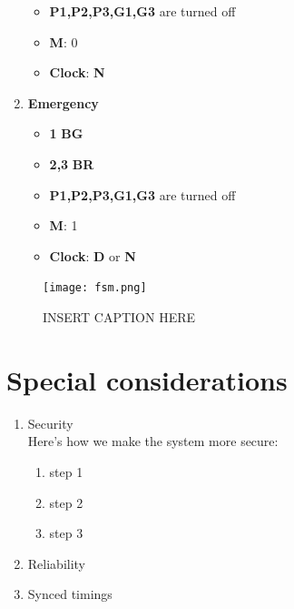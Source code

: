 \documentclass[letterpaper]{article}
\begin{document}
\begin{enumerate}
\begin{itemize}
        \item \textbf{P1,P2,P3,G1,G3} are turned off
        \item \textbf{M}: 0
        \item \textbf{Clock}: \textbf{N}
       \end{itemize}
 \item \textbf{Emergency}
       \begin{itemize}
        \item {\color{green}\textbf{1}} \textbf{BG}
        \item {\color{red}\textbf{2,3}} \textbf{BR}
        \item \textbf{P1,P2,P3,G1,G3} are turned off
        \item \textbf{M}: 1
        \item \textbf{Clock}: \textbf{D} or \textbf{N}
       \end{itemize}
\end{enumerate}

\begin{figure}[H]
 \centering
 \texttt{[image: fsm.png]}
 \caption{INSERT CAPTION HERE}
 \label{fsm}
\end{figure}

\section{Special considerations}

\begin{enumerate}
 \item Security\\
       Here's how we make the system more secure:
       \begin{enumerate}
        \item step 1
        \item step 2
        \item step 3
       \end{enumerate}
 \item Reliability
 \item Synced timings
\end{enumerate}
\end{document}
